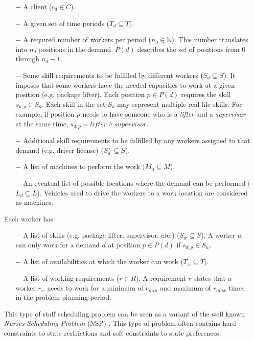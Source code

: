 \documentclass[../thesis.tex]{subfiles}
\begin{document}
\begin{itemize}
  \item[$-$] A client ($c_d \in C$).
  \item[$-$] A given set of time periods ($T_d \subseteq T$).
  \item[$-$] A required number of workers per period ($n_d \in \mathbb{N}$).
      This number translates into $n_d$ positions in the demand. 
      $P(d)$ describes the set of positions from $0$ through $n_d - 1$. 
  \item[$-$] Some skill requirements to be fulfilled by different workers ($S_d \subseteq S$).
  It imposes that some workers have the needed capacities to work at a given position (e.g. package lifter).
  Each position $p \in P(d)$ requires the skill $s_{d,p} \in S_d$. Each skill in the set $S_d$ may represent
  multiple real-life skills. For example, if position $p$ needs to have someone who is a \emph{lifter} and a \emph{supervisor} at the same 
  time, $s_{d,p} = lifter \land supervisor$.
  \item[$-$] Additional skill requirements to be fulfilled by any workers assigned to that demand (e.g. driver license) ($S^{+}_d \subseteq S$).
  \item[$-$] A list of machines to perform the work ($M_d \subseteq M$).
  \item[$-$] An eventual list of possible locations where the demand can be performed ($L_d \subseteq L$).
  Vehicles used to drive the workers to a work location are considered as machines.
\end{itemize}


Each worker has:

\begin{itemize}
  \item[$-$] A list of skills (e.g. package lifter, supervisor, etc.) ($S_w \subseteq S$).
             A worker $w$ can only work for a demand $d$ at position $p \in P(d)$ if $s_{d,p} \in S_w$. 
  \item[$-$] A list of availabilities at which the worker can work ($T_w \subseteq T$).  
  \item[$-$] A list of working requirements ($r \in R$). A requirement $r$ states that a worker $r_w$
  needs to work for a minimum of $r_{min}$ and maximum of $r_{max}$ times in the problem planning period.  
\end{itemize}


This type of staff scheduling problem can be seen as a variant of the 
well known \emph{Nurses Scheduling Problem} (NSP) \cite{Burke2004}. 
This type of problem often contains hard constraints to state restrictions 
and soft constraints to state preferences. 
\end{document}
